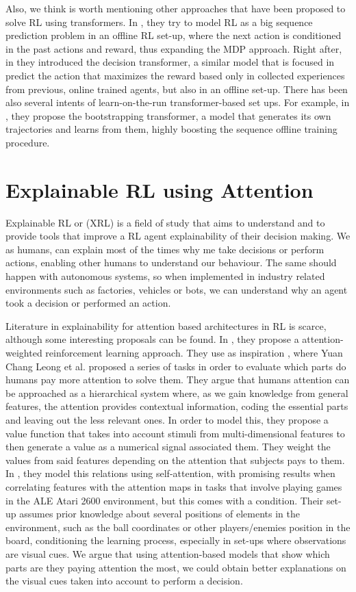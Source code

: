 Also, we think is worth mentioning other approaches that have been proposed to solve RL using transformers. In \cite{janner2021offline}, they try to model RL as a big sequence prediction problem in an offline RL set-up, where the next action is conditioned in the past actions and reward, thus expanding the MDP approach. Right after, in \cite{chen2021decision} they introduced the decision transformer, a similar model that is focused in predict the action that maximizes the reward based only in collected experiences from previous, online trained agents, but also in an offline set-up. There has been also several intents of learn-on-the-run transformer-based set ups. For example, in \cite{wang2022bootstrapped}, they propose the bootstrapping transformer, a model that generates its own trajectories and learns from them, highly boosting the sequence offline training procedure.


\section{Explainable RL using Attention}
Explainable RL or (XRL) is a field of study that aims to understand and to provide tools that improve a RL agent explainability of their decision making.
We as humans, can explain most of the times why me take decisions or perform actions, enabling other humans to understand our behaviour. The same should happen with autonomous systems, so when implemented in industry related environments such as factories, vehicles or bots, we can understand why an agent took a decision or performed an action.

Literature in explainability for attention based architectures in RL is scarce, although some interesting proposals can be found. In \cite{BRAMLAGE202210}, they propose a attention-weighted reinforcement learning approach. They use as inspiration \cite{LEONG2017451}, where Yuan Chang Leong et al. proposed a series of tasks in order to evaluate which parts do humans pay more attention to solve them. They argue that humans attention can be approached as a hierarchical system where, as we gain knowledge from general features, the attention provides contextual information, coding the essential parts and leaving out the less relevant ones. In order to model this, they propose a value function that takes into account stimuli from multi-dimensional features to then generate a value as a numerical signal associated them. They weight the values from said features depending on the attention that subjects pays to them. In \cite{BRAMLAGE202210}, they model this relations using self-attention, with promising results when correlating features with the attention maps in tasks that involve playing games in the ALE Atari 2600 environment, but this comes with a condition. Their set-up assumes prior knowledge about several positions of elements in the environment, such as the ball coordinates or other players/enemies position in the board, conditioning the learning process, especially in set-ups where observations are visual cues. We argue that using attention-based models that show which parts are they paying attention the most, we could obtain better explanations on the visual cues taken into account to perform a decision.
